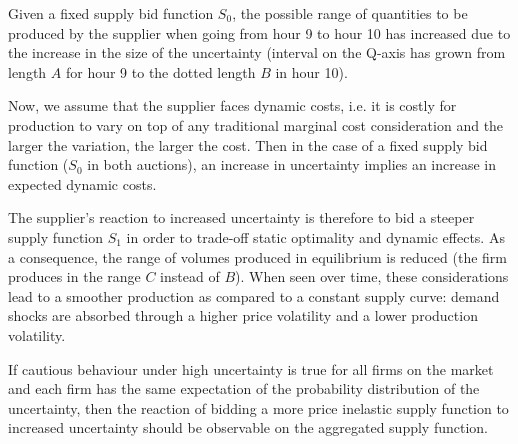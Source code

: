 Given a fixed supply bid function $S_0$, the possible range of quantities to be produced by the supplier when going from hour 9 to hour 10 has increased due to the increase in the size of the uncertainty (interval on the Q-axis has grown from length $A$ for hour 9 to the dotted length $B$ in hour 10).

Now, we assume that the supplier faces dynamic costs, i.e. it is costly for production to vary on top of any traditional marginal cost consideration and the larger the variation, the larger the cost.  Then in the case of a fixed supply bid function ($S_0$ in both auctions), an increase in uncertainty implies an increase in expected dynamic costs. 

The supplier's reaction to increased uncertainty is therefore to bid a steeper supply function $S_1$ in order to trade-off static optimality and dynamic effects. As a consequence, the range of volumes produced in equilibrium is reduced (the firm produces in the range $C$ instead of $B$). When seen over time, these considerations lead to a smoother production as compared to a constant supply curve: demand shocks are absorbed through a higher price volatility and a lower production volatility. %


If cautious behaviour under high uncertainty is true for all firms on the market and each firm has the same expectation of the probability distribution of the uncertainty, then the reaction of bidding a more price inelastic supply function to increased uncertainty should be observable on the aggregated supply function. 


